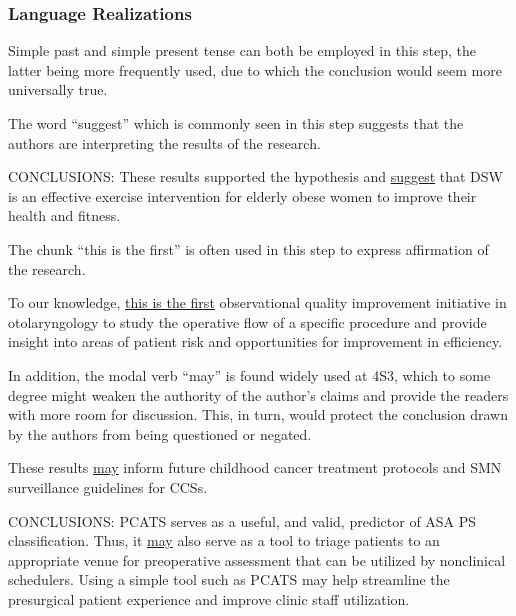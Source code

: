 \documentclass{ctexbook}
\begin{document}
    \subsubsection{Language Realizations}

    Simple past and simple present tense can both be employed in this step, the latter being more frequently used, due to which the conclusion would seem more universally true.
    
    The word ``suggest'' which is commonly seen in this step suggests that the authors are interpreting the results of the research.

    \begin{eg}{}
      CONCLUSIONS: These results supported the hypothesis and \uline{suggest} that DSW is an effective exercise intervention for elderly obese women to improve their health and fitness.
    \end{eg}
    
    The chunk ``this is the first'' is often used in this step to express affirmation of the research.

    \begin{eg}{}
      To our knowledge, \uline{this is the first} observational quality improvement initiative in otolaryngology to study the operative flow of a specific procedure and provide insight into areas of patient risk and opportunities for improvement in efficiency.  
    \end{eg}
    
    In addition, the modal verb ``may'' is found widely used at 4S3, which to some degree might weaken the authority of the author's claims and provide the readers with more room for discussion. This, in turn, would protect the conclusion drawn by the authors from being questioned or negated.

    \begin{eg}{}
      These results \uline{may} inform future childhood cancer treatment protocols and SMN surveillance guidelines for CCSs.
    \end{eg}

    \begin{eg}{}
      CONCLUSIONS: PCATS serves as a useful, and valid, predictor of ASA PS classification. Thus, it \uline{may} also serve as a tool to triage patients to an appropriate venue for preoperative assessment that can be utilized by nonclinical schedulers. Using a simple tool such as PCATS may help streamline the presurgical patient experience and improve clinic staff utilization.
    \end{eg}
\end{document}
